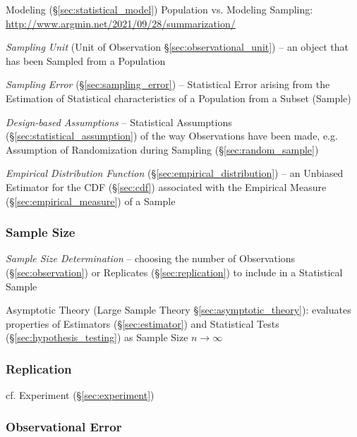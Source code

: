 \fist Modeling (\S\ref{sec:statistical_model}) Population vs. Modeling Sampling:
\url{http://www.argmin.net/2021/09/28/summarization/}

\fist \emph{Sampling Unit} (Unit of Observation \S\ref{sec:observational_unit})
-- an object that has been Sampled from a Population

\fist \emph{Sampling Error} (\S\ref{sec:sampling_error}) -- Statistical Error
arising from the Estimation of Statistical characteristics of a Population from
a Subset (Sample)

\fist \emph{Design-based Assumptions} -- Statistical Assumptions
(\S\ref{sec:statistical_assumption}) of the way Observations have been made,
e.g. Assumption of Randomization during Sampling (\S\ref{sec:random_sample})

\emph{Empirical Distribution Function} (\S\ref{sec:empirical_distribution}) --
an Unbiased Estimator for the CDF (\S\ref{sec:cdf}) associated with the
Empirical Measure (\S\ref{sec:empirical_measure}) of a Sample



\subsubsection{Sample Size}\label{sec:sample_size}

\emph{Sample Size Determination} -- choosing the number of Observations
(\S\ref{sec:observation}) or Replicates (\S\ref{sec:replication}) to include in
a Statistical Sample

\fist Asymptotic Theory (Large Sample Theory \S\ref{sec:asymptotic_theory}):
evaluates properties of Estimators (\S\ref{sec:estimator}) and Statistical Tests
(\S\ref{sec:hypothesis_testing}) as Sample Size $n \to \infty$



\subsubsection{Replication}\label{sec:sampling_replication}


cf. Experiment (\S\ref{sec:experiment})



\subsubsection{Observational Error}\label{sec:observational_error}

